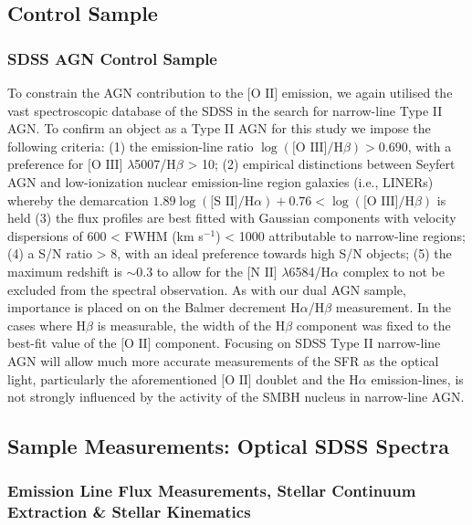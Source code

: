 \subsection{Control Sample}

\subsubsection{SDSS AGN Control Sample}

To constrain the AGN contribution to the $\text{[O II]}$ emission, we again utilised the vast spectroscopic database of the SDSS in the search for narrow-line Type II AGN. To confirm an object as a Type II AGN for this study we impose the following criteria: (1) the emission-line ratio $\log(\text{[O III]}/\text{H}\beta)>{0.690}$, with a preference for $\text{[O III]}$ $\lambda$5007/$\text{H}\beta$ > 10; (2) empirical distinctions between Seyfert AGN and low-ionization nuclear emission-line region galaxies (i.e., LINERs) whereby the demarcation ${1.89\log{(\text{[S II]}/\text{H}\alpha)}+0.76}<{\log{(\text{[O III]}/\text{H}\beta)}}$ is held (3) the flux profiles are best fitted with Gaussian components with velocity dispersions of 600 < FWHM (km s$^{-1}$) < 1000 attributable to narrow-line regions; (4) a S/N ratio > 8, with an ideal preference towards high S/N objects; (5) the maximum redshift is $\sim{0.3}$ to allow for the $\text{[N II]}$ $\lambda$6584/$\text{H}\alpha$ complex to not be excluded from the spectral observation. As with our dual AGN sample, importance is placed on on the Balmer decrement $\text{H}\alpha$/$\text{H}\beta$ measurement. In the cases where $\text{H}\beta$ is measurable, the width of the $\text{H}\beta$ component was fixed to the best-fit value of the $\text{[O II]}$ component. Focusing on SDSS Type II narrow-line AGN will allow much more accurate measurements of the SFR as the optical light, particularly the aforementioned $\text{[O II]}$ doublet and the $\text{H}\alpha$ emission-lines, is not strongly influenced by the activity of the SMBH nucleus in narrow-line AGN.

\subsection{Sample Measurements: Optical SDSS Spectra}

\subsubsection{Emission Line Flux Measurements, Stellar Continuum Extraction \& Stellar Kinematics}

